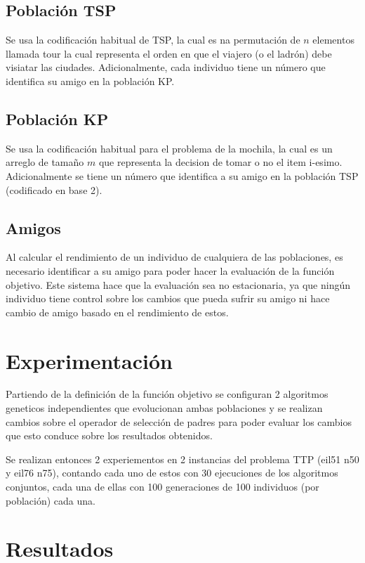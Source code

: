 \documentclass[twocolumn]{IEEEtran}
\begin{document}
\subsection{Población TSP}
Se usa la codificación habitual de TSP, la cual es na permutación de $n$ elementos llamada tour
la cual representa el orden en que el viajero (o el ladrón) debe visiatar las ciudades.
Adicionalmente, cada individuo tiene un número que identifica su amigo en la población KP.

\subsection{Población KP}
Se usa la codificación habitual para el problema de la mochila, la cual es un 
arreglo de tamaño $m$ que representa la decision de tomar o no el item i-esimo.
Adicionalmente se tiene un número que identifica a su amigo en la población TSP (codificado en base 2).

\subsection*{Amigos}
Al calcular el rendimiento de un individuo de cualquiera de las poblaciones, es necesario identificar
a su amigo para poder hacer la evaluación de la función objetivo.
Este sistema hace que la evaluación sea no estacionaria, ya que ningún individuo tiene control
sobre los cambios que pueda sufrir su amigo ni hace cambio de amigo basado en el rendimiento de estos.

\section{Experimentación}
Partiendo de la definición de la función objetivo se configuran 2 algoritmos geneticos
independientes que evolucionan ambas poblaciones y se realizan cambios sobre el operador de
selección de padres para poder evaluar los cambios que esto conduce sobre los resultados obtenidos.

Se realizan entonces 2 experiementos en 2 instancias del problema TTP (eil51 n50 y eil76 n75),
contando cada uno de estos con 30 ejecuciones de los
algoritmos conjuntos, cada una de ellas con 100 generaciones de 100 individuos
(por población) cada una.

\section{Resultados}
\end{document}
